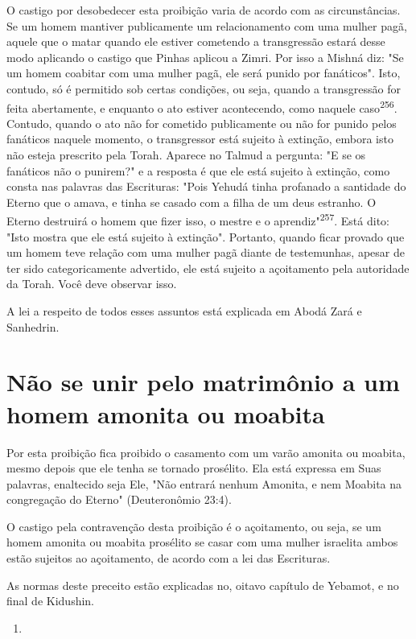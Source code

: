 \begin{itemize}
\begin{enumrate}
\begin{itemize}
\begin{itemize}
\begin{itemize}
O castigo por desobedecer esta proibição varia de acordo com as
circunstâncias. Se um homem mantiver publicamente um relacionamento com
uma mulher pagã, aquele que o matar quando ele estiver cometendo a
trans­gressão estará desse modo aplicando o castigo que Pinhas aplicou a
Zimri. Por isso a Mishná diz: "Se um homem coabitar com uma mulher pagã,
ele será pu­nido por fanáticos". Isto, contudo, só é permitido sob
certas condições, ou se­ja, quando a transgressão for feita abertamente,
e enquanto o ato estiver acon­tecendo, como naquele
caso\textsuperscript{256}. Contudo, quando o ato não for cometido
pu­blicamente ou não for punido pelos fanáticos naquele momento, o
transgres­sor está sujeito à extinção, embora isto não esteja prescrito
pela Torah. Apare­ce no Talmud a pergunta: "E se os fanáticos não o
punirem?" e a resposta é que ele está sujeito à extinção, como consta
nas palavras das Escrituras: "Pois Yehudá tinha profanado a santidade do
Eterno que o amava, e tinha se casado com a filha de um deus estranho. O
Eterno destruirá o homem que fizer isso, o mestre e o
aprendiz"\textsuperscript{257}. Está dito: "Isto mostra que ele está
sujeito à extin­ção". Portanto, quando ficar provado que um homem teve
relação com uma mulher pagã diante de testemunhas, apesar de ter sido
categoricamente adver­tido, ele está sujeito a açoitamento pela
autoridade da Torah. Você deve obser­var isso.

A lei a respeito de todos esses assuntos está explicada em Abodá Za­rá e
Sanhedrin.


\section{Não se unir pelo matrimônio a um homem amonita ou moabita}


Por esta proibição fica proibido o casamento com um varão amoni­ta ou
moabita, mesmo depois que ele tenha se tornado prosélito. Ela está
ex­pressa em Suas palavras, enaltecido seja Ele, "Não entrará nenhum
Amonita, e nem Moabita na congregação do Eterno" (Deuteronômio 23:4).

O castigo pela contravenção desta proibição é o açoitamento, ou se­ja,
se um homem amonita ou moabita prosélito se casar com uma mulher
israe­lita ambos estão sujeitos ao açoitamento, de acordo com a lei das
Escrituras.

As normas deste preceito estão explicadas no, oitavo capítulo de
Ye­bamot, e no final de Kidushin.


\begin{enumerate}
\def\labelenumi{\arabic{enumi}.}
\setcounter{enumi}{255}
\item
 

\end{enumerate}
\end{itemize}
\end{itemize}
\end{itemize}
\end{enumrate}
\end{itemize}
